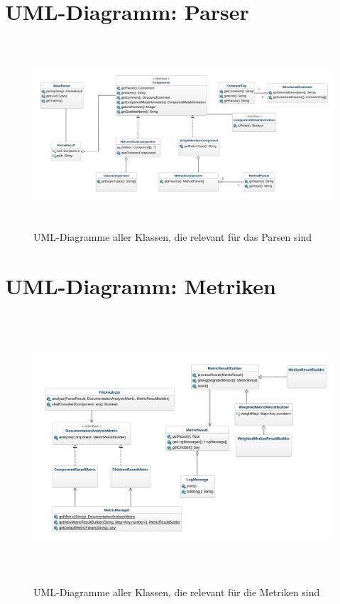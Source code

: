 \begin{appendices}
\chapter{UML-Diagramm: Parser}
\begin{figure}[ht!]
    \centering
    \includegraphics[height=7cm,keepaspectratio,angle=90]{figures/uml/parsing.png}
    \caption{UML-Diagramme aller Klassen, die relevant für das Parsen sind}
    \label{fig:uml_parsing}
\end{figure}
\chapter{UML-Diagramm: Metriken}
\begin{figure}[ht!]
    \centering
    \includegraphics[height=10cm,keepaspectratio,angle=90]{figures/uml/metriken.png}
    \caption{UML-Diagramme aller Klassen, die relevant für die Metriken sind}
    \label{fig:uml_metrics}
\end{figure}

\end{appendices}

